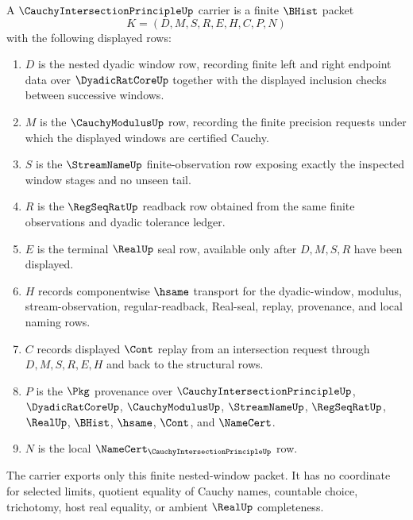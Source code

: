 \begin{definition}
\label{def:cauchy-intersection-principle-carrier}
A $\CauchyIntersectionPrincipleUp$ carrier is a finite $\BHist$ packet
$$
K=(D,M,S,R,E,H,C,P,N)
$$
with the following displayed rows:
\begin{enumerate}
\item $D$ is the nested dyadic window row, recording finite left and right endpoint data over $\DyadicRatCoreUp$ together with the displayed inclusion checks between successive windows.
\item $M$ is the $\CauchyModulusUp$ row, recording the finite precision requests under which the displayed windows are certified Cauchy.
\item $S$ is the $\StreamNameUp$ finite-observation row exposing exactly the inspected window stages and no unseen tail.
\item $R$ is the $\RegSeqRatUp$ readback row obtained from the same finite observations and dyadic tolerance ledger.
\item $E$ is the terminal $\RealUp$ seal row, available only after $D,M,S,R$ have been displayed.
\item $H$ records componentwise $\hsame$ transport for the dyadic-window, modulus, stream-observation, regular-readback, Real-seal, replay, provenance, and local naming rows.
\item $C$ records displayed $\Cont$ replay from an intersection request through $D,M,S,R,E,H$ and back to the structural rows.
\item $P$ is the $\Pkg$ provenance over $\CauchyIntersectionPrincipleUp$, $\DyadicRatCoreUp$, $\CauchyModulusUp$, $\StreamNameUp$, $\RegSeqRatUp$, $\RealUp$, $\BHist$, $\hsame$, $\Cont$, and $\NameCert$.
\item $N$ is the local $\NameCert_{\CauchyIntersectionPrincipleUp}$ row.
\end{enumerate}
The carrier exports only this finite nested-window packet. It has no coordinate for selected limits, quotient equality of Cauchy names, countable choice, trichotomy, host real equality, or ambient $\RealUp$ completeness.
\end{definition}

